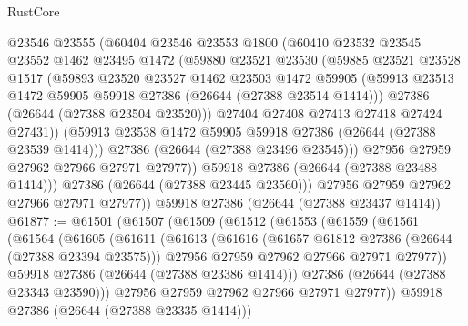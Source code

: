 \begin{lexlean}{RustCore}
\begin{coremodule}
              @23546
              @23555
              (@60404
                @23546
                @23553
                @1800
                (@60410
                  @23532
                  @23545
                  @23552
                  @1462
                  @23495
                  @1472
                  (@59880
                    @23521
                    @23530
                    (@59885
                      @23521
                      @23528
                      @1517
                      (@59893
                        @23520
                        @23527
                        @1462
                        @23503
                        @1472
                        @59905
                        (@59913 @23513 @1472 @59905 @59918 @27386 (@26644 (@27388 @23514 @1414)))
                        @27386
                        (@26644 (@27388 @23504 @23520)))
                      @27404
                      @27408
                      @27413
                      @27418
                      @27424
                      @27431))
                  (@59913 @23538 @1472 @59905 @59918 @27386 (@26644 (@27388 @23539 @1414)))
                  @27386
                  (@26644 (@27388 @23496 @23545)))
                @27956
                @27959
                @27962
                @27966
                @27971
                @27977))
            @59918
            @27386
            (@26644 (@27388 @23488 @1414)))
          @27386
          (@26644 (@27388 @23445 @23560)))
        @27956
        @27959
        @27962
        @27966
        @27971
        @27977))
    @59918
    @27386
    (@26644 (@27388 @23437 @1414))
@61877 := @61501
    (@61507
      (@61509
        (@61512
          (@61553
            (@61559
              (@61561
                (@61564
                  (@61605
                    (@61611
                      (@61613
                        (@61616
                          (@61657 @61812 @27386 (@26644 (@27388 @23394 @23575)))
                          @27956
                          @27959
                          @27962
                          @27966
                          @27971
                          @27977))
                      @59918
                      @27386
                      (@26644 (@27388 @23386 @1414)))
                    @27386
                    (@26644 (@27388 @23343 @23590)))
                  @27956
                  @27959
                  @27962
                  @27966
                  @27971
                  @27977))
              @59918
              @27386
              (@26644 (@27388 @23335 @1414)))

\end{coremodule}
\end{lexlean}
